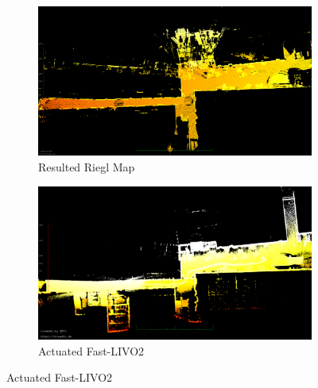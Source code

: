 \documentclass[conference]{IEEEtran}
\begin{document}
\begin{figure}[t]
\centering
\begin{subfigure}{0.48\columnwidth}
        \centering
        \includegraphics[width=\textwidth]{pics/eagle_view/riegl_top.png}
        \caption{Resulted Riegl Map}
        \label{fig:riegl_top}\end{subfigure}
\hfill
\begin{subfigure}{0.48\columnwidth}
        \centering
        \includegraphics[width=\textwidth]{pics/eagle_view/act_livo_to.png}
        \caption{Actuated Fast-LIVO2}
        \label{fig:act_livo_top}
\end{subfigure}


\end{figure}
\end{document}
